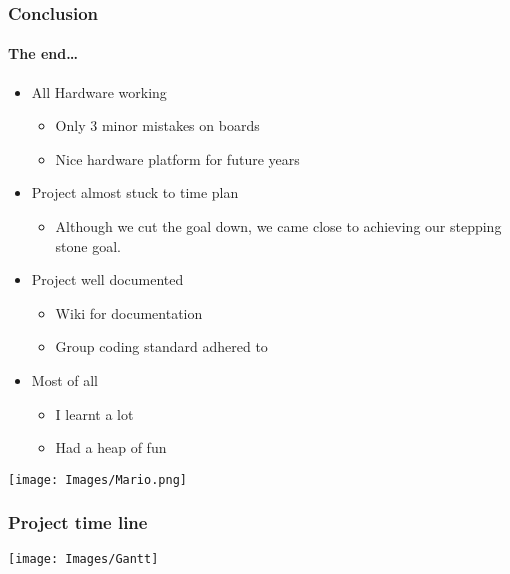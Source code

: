 \documentclass{beamer}
\begin{document}
\begin{frame}
\frametitle{Conclusion}
\framesubtitle{The end\ldots}
\begin{itemize}
\item All Hardware working
  \begin{itemize}
  \item Only 3 minor mistakes on boards
  \item Nice hardware platform for future years
  \end{itemize}
\item Project almost stuck to time plan
  \begin{itemize}
  \item Although we cut the goal down, we came close to achieving our stepping
  stone goal.
  \end{itemize}
\item Project well documented
  \begin{itemize}
  \item Wiki for documentation
  \item Group coding standard adhered to
  \end{itemize}
\item Most of all
  \begin{itemize}
  \item I learnt a lot
  \item Had a heap of fun
  \end{itemize}
\end{itemize}
\end{frame}

\begin{frame}
\begin{center}
\texttt{[image: Images/Mario.png]}
\end{center}
\end{frame}


\begin{frame}
\frametitle{Project time line}
    \begin{center}
      \texttt{[image: Images/Gantt]}
    \end{center}
\end{frame}
\end{document}
